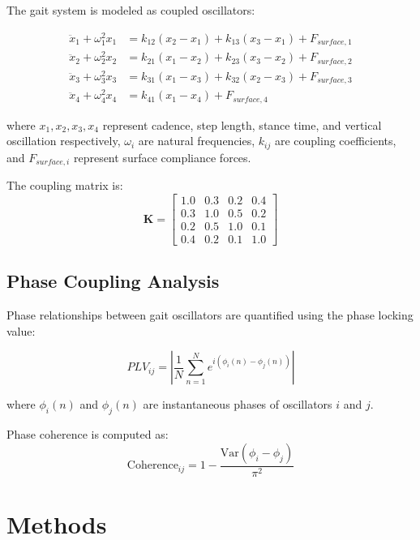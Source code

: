 \documentclass[12pt]{article}
\begin{document}
The gait system is modeled as coupled oscillators:

\begin{align}
\ddot{x}_1 + \omega_1^2 x_1 &= k_{12}(x_2 - x_1) + k_{13}(x_3 - x_1) + F_{surface,1} \\
\ddot{x}_2 + \omega_2^2 x_2 &= k_{21}(x_1 - x_2) + k_{23}(x_3 - x_2) + F_{surface,2} \\
\ddot{x}_3 + \omega_3^2 x_3 &= k_{31}(x_1 - x_3) + k_{32}(x_2 - x_3) + F_{surface,3} \\
\ddot{x}_4 + \omega_4^2 x_4 &= k_{41}(x_1 - x_4) + F_{surface,4}
\end{align}

where $x_1, x_2, x_3, x_4$ represent cadence, step length, stance time, and vertical oscillation respectively, $\omega_i$ are natural frequencies, $k_{ij}$ are coupling coefficients, and $F_{surface,i}$ represent surface compliance forces.

The coupling matrix is:
\begin{equation}
\mathbf{K} = \begin{bmatrix}
1.0 & 0.3 & 0.2 & 0.4 \\
0.3 & 1.0 & 0.5 & 0.2 \\
0.2 & 0.5 & 1.0 & 0.1 \\
0.4 & 0.2 & 0.1 & 1.0
\end{bmatrix}
\end{equation}

\subsection{Phase Coupling Analysis}

Phase relationships between gait oscillators are quantified using the phase locking value:

\begin{equation}
PLV_{ij} = \left| \frac{1}{N} \sum_{n=1}^{N} e^{i(\phi_i(n) - \phi_j(n))} \right|
\end{equation}

where $\phi_i(n)$ and $\phi_j(n)$ are instantaneous phases of oscillators $i$ and $j$.

Phase coherence is computed as:
\begin{equation}
\text{Coherence}_{ij} = 1 - \frac{\text{Var}(\phi_i - \phi_j)}{\pi^2}
\end{equation}

\section{Methods}
\end{document}
